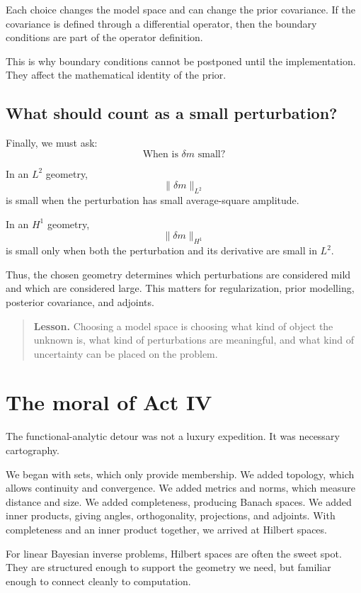 \documentclass[11pt,a4paper]{book}
\newenvironment{lesson}
  {\begin{quote}\textbf{Lesson.}}
  {\end{quote}}
\begin{document}
Each choice changes the model space and can change the prior covariance. If the
covariance is defined through a differential operator, then the boundary
conditions are part of the operator definition.

This is why boundary conditions cannot be postponed until the implementation.
They affect the mathematical identity of the prior.

\subsection{What should count as a small perturbation?}

Finally, we must ask:
\[
    \text{When is } \delta m \text{ small?}
\]

In an $L^2$ geometry,
\[
    \|\delta m\|_{L^2}
\]
is small when the perturbation has small average-square amplitude.

In an $H^1$ geometry,
\[
    \|\delta m\|_{H^1}
\]
is small only when both the perturbation and its derivative are small in
$L^2$.

Thus, the chosen geometry determines which perturbations are considered mild
and which are considered large. This matters for regularization, prior
modelling, posterior covariance, and adjoints.

\begin{lesson}
Choosing a model space is choosing what kind of object the unknown is, what
kind of perturbations are meaningful, and what kind of uncertainty can be
placed on the problem.
\end{lesson}

\section{The moral of Act IV}

The functional-analytic detour was not a luxury expedition. It was necessary
cartography.

We began with sets, which only provide membership. We added topology, which
allows continuity and convergence. We added metrics and norms, which measure
distance and size. We added completeness, producing Banach spaces. We added
inner products, giving angles, orthogonality, projections, and adjoints. With
completeness and an inner product together, we arrived at Hilbert spaces.

For linear Bayesian inverse problems, Hilbert spaces are often the sweet spot.
They are structured enough to support the geometry we need, but familiar enough
to connect cleanly to computation.
\end{document}

